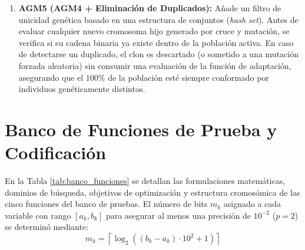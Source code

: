 \documentclass[11pt,letterpaper]{article}
\begin{document}
\begin{enumerate}
    \item \textbf{AGM5 (AGM4 + Eliminación de Duplicados):} Añade un filtro de unicidad genética basado en una estructura de conjuntos (\textit{hash set}). Antes de evaluar cualquier nuevo cromosoma hijo generado por cruce y mutación, se verifica si su cadena binaria ya existe dentro de la población activa. En caso de detectarse un duplicado, el clon es descartado (o sometido a una mutación forzada aleatoria) sin consumir una evaluación de la función de adaptación, asegurando que el $100\%$ de la población esté siempre conformado por individuos genéticamente distintos.
\end{enumerate}

\section{Banco de Funciones de Prueba y Codificación}
En la Tabla \ref{tab:banco_funciones} se detallan las formulaciones matemáticas, dominios de búsqueda, objetivos de optimización y estructura cromosómica de las cinco funciones del banco de pruebas. El número de bits $m_k$ asignado a cada variable con rango $[a_k, b_k]$ para asegurar al menos una precisión de $10^{-2}$ ($p = 2$) se determinó mediante:
\begin{equation}
    m_k = \left\lceil \log_2\left((b_k - a_k) \cdot 10^2 + 1\right) \right\rceil
\end{equation}
\end{document}
